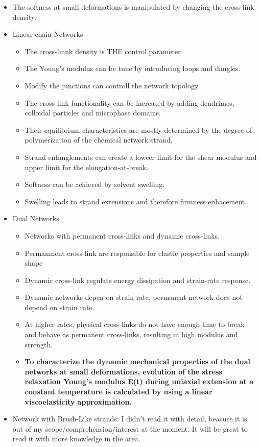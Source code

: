 \documentclass[a4paper, 11pt, oneside]{researchjournal} %
\begin{document}
\begin{itemize}
\begin{enumerate}
		\end{enumerate}
	\item The softness at small deformations is manipulated by changing the cross-link density.
	\item Linear chain Networks
	\begin{itemize}
		\item The cross-linnk density is THE control parameter
		\item The Young's modulus can be tune by introducing loops and dangles.
		\item Modify the junctions can controll the network topology
		\item The cross-link functionality can be increased by adding dendrimes, colloidal particles and microphase domains.
		\item Their equilibrium characteristics are mostly determined by the degree of polymerization of the chemical network strand.
		\item Strand entanglements can create a loweer limit for the shear modulus and upper limit for the elongation-at-break.
		\item Softness can be achieved by solvent swelling.
		\item Swelling leads to strand extensions and therefore firmness enhacement.
	\end{itemize}
	\item Dual Networks
	\begin{itemize}
		\item Networks with permanent cross-links  and dynamic cross-links.
		\item Permamnent cross-link are responsible for elastic properties and sample shape
		\item Dynamic cross-link regulate energy dissipation and strain-rate response.
		\item Dynamic networks depen on strain rate, permanent network does not depend on strain rate.
			\item At higher rates, physical cross-links do not have enough time to break and behave as permanent cross-links, resulting in high modulus and strength.
		\item \textbf{To characterize the dynamic mechanical properties of the dual networks at small deformations, evolution of the stress relaxation Young’s modulus E(t) during uniaxial extension at a constant temperature is calculated by using a linear viscoelasticity approximation.}
	\end{itemize}
	\item Network with Brush-Like strands: I didn't read it with detail, beacuse it is out of my scope/comprehension/interest at the moment. It will be great to read it with more knowledge in the area.
\end{itemize}
\end{document}

